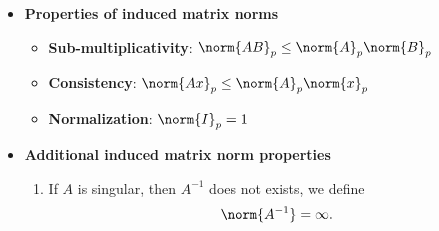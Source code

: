 \documentclass{report}
\begin{document}
\begin{itemize}
        \item \textbf{Properties of induced matrix norms}
            \begin{itemize}
                \item \textbf{Sub-multiplicativity}: $\norm{AB}_{p} \leq \norm{A}_{p}\norm{B}_{p} $
                \item \textbf{Consistency}: $\norm{Ax}_{p} \leq \norm{A}_{p}\norm{x}_{p} $
                \item \textbf{Normalization}: $\norm{I}_{p} = 1 $
            \end{itemize}
        \item \textbf{Additional induced matrix norm properties}
            \begin{enumerate}
                \item If $A$ is singular, then $A^{-1}$ does not exists, we define
                    \begin{align*}
                        \norm{A^{-1}} = \infty
                    .\end{align*}


\end{enumerate}
\end{itemize}
\end{document}
